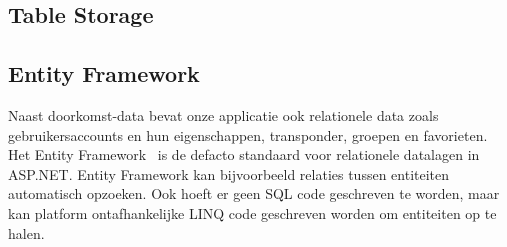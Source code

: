 

\subsection{Table Storage}

\subsection{Entity Framework}
Naast doorkomst-data bevat onze applicatie ook relationele data zoals gebruikersaccounts en hun eigenschappen, transponder, groepen en favorieten. Het Entity Framework~\cite{entityframework-msdn, entityframework-facto} is de defacto standaard voor relationele datalagen in ASP.NET. Entity Framework kan bijvoorbeeld relaties tussen entiteiten automatisch opzoeken. Ook hoeft er geen SQL code geschreven te worden, maar kan platform ontafhankelijke LINQ code geschreven worden om entiteiten op te halen.